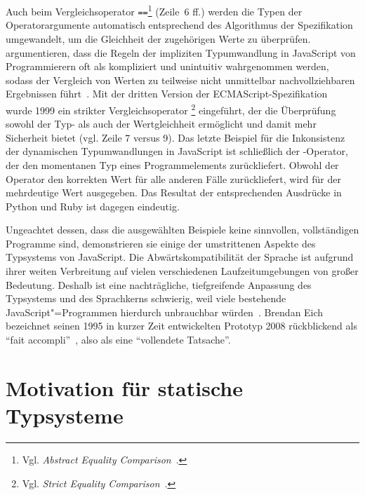 

Auch beim Vergleichsoperator \texttt{==}\footnote{Vgl. \textit{Abstract Equality Comparison}~\autocite[68]{ECMASCRIPT:2019}.} (Zeile~6 ff.) werden die Typen der Operatorargumente automatisch entsprechend des Algorithmus der Spezifikation umgewandelt, um die Gleichheit der zugehörigen Werte zu überprüfen. \citeauthor{PRADEL:2015} argumentieren, dass die Regeln der impliziten Typumwandlung in JavaScript von Programmierern oft als kompliziert und unintuitiv wahrgenommen werden, sodass der Vergleich von Werten zu teilweise nicht unmittelbar nachvollziehbaren Ergebnissen führt~\autocite{PRADEL:2015}.
Mit der dritten Version der ECMAScript-Spezifikation~\autocite{ECMASCRIPT:1999} wurde 1999 ein strikter Vergleichsoperator \code{===}\footnote{Vgl. \textit{Strict Equality Comparison}~\autocite[68]{ECMASCRIPT:2019}.} eingeführt, der die Überprüfung sowohl der Typ- als auch der Wertgleichheit ermöglicht und damit mehr Sicherheit bietet (vgl. Zeile 7 versus 9).
Das letzte Beispiel für die Inkonsistenz der dynamischen Typumwandlungen in JavaScript ist schließlich der -Operator, der den momentanen Typ eines Programmelements zurückliefert. Obwohl der Operator den korrekten Wert für alle anderen Fälle zurückliefert, wird für  der mehrdeutige Wert  ausgegeben. Das Resultat der entsprechenden Ausdrücke in Python und Ruby ist dagegen eindeutig.

Ungeachtet dessen, dass die ausgewählten Beispiele keine sinnvollen, vollständigen Programme sind, demonstrieren sie einige der umstrittenen Aspekte des Typsystems von JavaScript. Die Abwärtskompatibilität der Sprache ist aufgrund ihrer weiten Verbreitung auf vielen verschiedenen Laufzeitumgebungen von großer Bedeutung. Deshalb ist eine nachträgliche, tiefgreifende Anpassung des Typsystems und des Sprachkerns schwierig, weil viele bestehende JavaScript"=Programmen hierdurch unbrauchbar würden~\autocite[1]{CROCKFORD:JS_GOOD_PARTS}. Brendan Eich bezeichnet seinen 1995 in kurzer Zeit entwickelten Prototyp 2008 rückblickend als \enquote{fait accompli}~\autocite{EICH:POPULARITY}, also als eine \enquote{vollendete Tatsache}.

\section{Motivation für statische Typsysteme}

